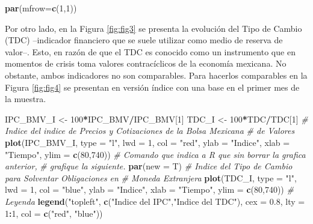 \documentclass[
]{book}
\newenvironment{Shaded}{\begin{snugshade}}{\end{snugshade}}
\newcommand{\AttributeTok}[1]{\textcolor[rgb]{0.13,0.29,0.53}{#1}}
\newcommand{\CommentTok}[1]{\textcolor[rgb]{0.56,0.35,0.01}{\textit{#1}}}
\newcommand{\DecValTok}[1]{\textcolor[rgb]{0.00,0.00,0.81}{#1}}
\newcommand{\FloatTok}[1]{\textcolor[rgb]{0.00,0.00,0.81}{#1}}
\newcommand{\FunctionTok}[1]{\textcolor[rgb]{0.13,0.29,0.53}{\textbf{#1}}}
\newcommand{\NormalTok}[1]{#1}
\newcommand{\OtherTok}[1]{\textcolor[rgb]{0.56,0.35,0.01}{#1}}
\newcommand{\SpecialCharTok}[1]{\textcolor[rgb]{0.81,0.36,0.00}{\textbf{#1}}}
\newcommand{\StringTok}[1]{\textcolor[rgb]{0.31,0.60,0.02}{#1}}
\begin{document}
\begin{Shaded}
\begin{Highlighting}[]
\FunctionTok{par}\NormalTok{(}\AttributeTok{mfrow=}\FunctionTok{c}\NormalTok{(}\DecValTok{1}\NormalTok{,}\DecValTok{1}\NormalTok{))}
\end{Highlighting}
\end{Shaded}

Por otro lado, en la Figura \ref{fig:fig3} se presenta la evolución del Tipo de Cambio (TDC) --indicador financiero que se suele utilizar como medio de reserva de valor--. Esto, en razón de que el TDC es conocido como un instrumento que en momentos de crisis toma valores contracíclicos de la economía mexicana. No obstante, ambos indicadores no son comparables. Para hacerlos comparables en la Figura \ref{fig:fig4} se presentan en versión índice con una base en el primer mes de la muestra.

\begin{Shaded}
\begin{Highlighting}[]
\NormalTok{IPC\_BMV\_I }\OtherTok{\textless{}{-}} \DecValTok{100}\SpecialCharTok{*}\NormalTok{IPC\_BMV}\SpecialCharTok{/}\NormalTok{IPC\_BMV[}\DecValTok{1}\NormalTok{]}
\NormalTok{TDC\_I }\OtherTok{\textless{}{-}} \DecValTok{100}\SpecialCharTok{*}\NormalTok{TDC}\SpecialCharTok{/}\NormalTok{TDC[}\DecValTok{1}\NormalTok{]}
\CommentTok{\# Indice del indice de Precios y Cotizaciones de la Bolsa Mexicana }
\CommentTok{\# de Valores}
\FunctionTok{plot}\NormalTok{(IPC\_BMV\_I, }\AttributeTok{type =} \StringTok{"l"}\NormalTok{, }\AttributeTok{lwd =} \DecValTok{1}\NormalTok{, }\AttributeTok{col =} \StringTok{"red"}\NormalTok{, }\AttributeTok{ylab =} \StringTok{"Indice"}\NormalTok{, }
     \AttributeTok{xlab =} \StringTok{"Tiempo"}\NormalTok{, }\AttributeTok{ylim =} \FunctionTok{c}\NormalTok{(}\DecValTok{80}\NormalTok{,}\DecValTok{740}\NormalTok{))}
\CommentTok{\# Comando que indica a R que sin borrar la grafica anterior, }
\CommentTok{\# grafique la siguiente.}
\FunctionTok{par}\NormalTok{(}\AttributeTok{new =}\NormalTok{ T)}
\CommentTok{\# Indice del Tipo de Cambio para Solventar Obligaciones en }
\CommentTok{\# Moneda Extranjera}
\FunctionTok{plot}\NormalTok{(TDC\_I, }\AttributeTok{type =} \StringTok{"l"}\NormalTok{, }\AttributeTok{lwd =} \DecValTok{1}\NormalTok{, }\AttributeTok{col =} \StringTok{"blue"}\NormalTok{, }\AttributeTok{ylab =} \StringTok{"Indice"}\NormalTok{, }
     \AttributeTok{xlab =} \StringTok{"Tiempo"}\NormalTok{, }\AttributeTok{ylim =} \FunctionTok{c}\NormalTok{(}\DecValTok{80}\NormalTok{,}\DecValTok{740}\NormalTok{))}
\CommentTok{\# Leyenda}
\FunctionTok{legend}\NormalTok{(}\StringTok{"topleft"}\NormalTok{, }\FunctionTok{c}\NormalTok{(}\StringTok{"Indice del IPC"}\NormalTok{,}\StringTok{"Indice del TDC"}\NormalTok{), }\AttributeTok{cex =} \FloatTok{0.8}\NormalTok{, }
       \AttributeTok{lty =} \DecValTok{1}\SpecialCharTok{:}\DecValTok{1}\NormalTok{, }\AttributeTok{col =} \FunctionTok{c}\NormalTok{(}\StringTok{"red"}\NormalTok{, }\StringTok{"blue"}\NormalTok{))}
\end{Highlighting}
\end{Shaded}
\end{document}
